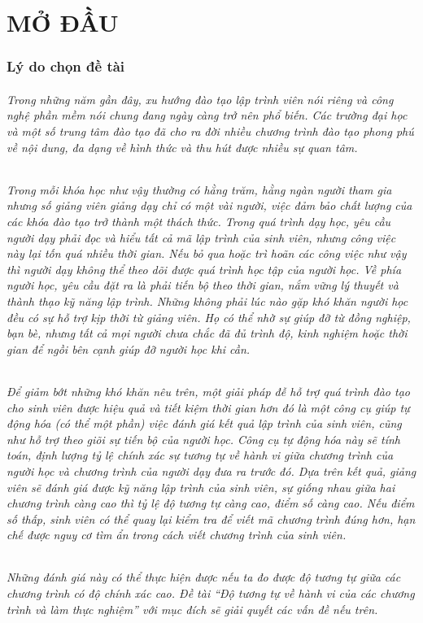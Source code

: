 \newpage

\part{MỞ ĐẦU}


\section{Lý do chọn đề tài}

\paragraph{Trong những năm gần đây, xu hướng đào tạo lập trình viên nói riêng và công nghệ phần mềm nói chung đang ngày càng trở nên phổ biến. Các trường đại học và một số trung tâm đào tạo đã cho ra đời nhiều chương trình đào tạo phong phú về nội dung, đa dạng về hình thức và thu hút được nhiều sự quan tâm.}

\paragraph{Trong mỗi khóa học như vậy thường có hằng trăm, hằng ngàn người tham gia nhưng số giảng viên giảng dạy chỉ có một vài người, việc đảm bảo chất lượng của các khóa đào tạo trở thành một thách thức. Trong quá trình dạy học, yêu cầu người dạy phải đọc và hiểu tất cả mã lập trình của sinh viên, nhưng công việc này lại tốn quá nhiều thời gian. Nếu bỏ qua hoặc trì hoãn các công việc như vậy thì người dạy không thể theo dõi được quá trình học tập của người học. Về phía người học, yêu cầu đặt ra là phải tiến bộ theo thời gian, nắm vững lý thuyết và thành thạo kỹ năng lập trình. Những không phải lúc nào gặp khó khăn người học đều có sự hỗ trợ kịp thời từ giảng viên. Họ có thể nhờ sự giúp đỡ từ đồng nghiệp, bạn bè, nhưng tất cả mọi người chưa chắc đã đủ trình độ, kinh nghiệm hoặc thời gian để ngồi bên cạnh giúp đỡ người học khi cần.}

\paragraph{Để giảm bớt những khó khăn nêu trên, một giải pháp đễ hỗ trợ quá trình đào tạo cho sinh viên được hiệu quả và tiết kiệm thời gian hơn đó là một công cụ giúp tự động hóa (có thể một phần) việc đánh giá kết quả lập trình của sinh viên, cũng như hỗ trợ theo giõi sự tiến bộ của người học. Công cụ tự động hóa này sẽ tính toán, định lượng tỷ lệ chính xác sự tương tự về hành vi giữa chương trình của người học và chương trình của người dạy đưa ra trước đó. Dựa trên kết quả, giảng viên sẽ đánh giá được kỹ năng lập trình của sinh viên, sự giống nhau giữa hai chương trình càng cao thì tỷ lệ độ tương tự càng cao, điểm số càng cao. Nếu điểm số thấp, sinh viên có thể quay lại kiểm tra để viết mã chương trình đúng hơn, hạn chế được nguy cơ tìm ẩn trong cách viết chương trình của sinh viên.}

\paragraph{Những đánh giá này có thể thực hiện được nếu ta đo được độ tương tự giữa các chương trình có độ chính xác cao. Đề tài “Độ tương tự về hành vi của các chương trình và làm thực nghiệm”  với mục đích sẽ giải quyết các vấn đề nếu trên.}
